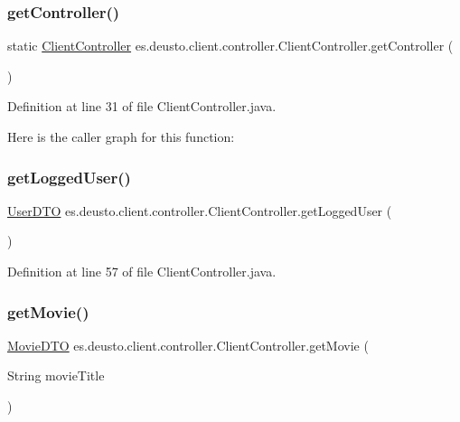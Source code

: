 \subsubsection{\texorpdfstring{getController()}{getController()}}
{\footnotesize\ttfamily static \mbox{\hyperlink{classes_1_1deusto_1_1client_1_1controller_1_1_client_controller}{Client\+Controller}} es.\+deusto.\+client.\+controller.\+Client\+Controller.\+get\+Controller (\begin{DoxyParamCaption}{ }\end{DoxyParamCaption})\hspace{0.3cm}{\ttfamily [static]}}



Definition at line 31 of file Client\+Controller.\+java.

Here is the caller graph for this function\+:
\mbox{\label{classes_1_1deusto_1_1client_1_1controller_1_1_client_controller_ac9d06db0017e2f06d06e8669398118f4}} 
\subsubsection{\texorpdfstring{getLoggedUser()}{getLoggedUser()}}
{\footnotesize\ttfamily \mbox{\hyperlink{classes_1_1deusto_1_1server_1_1data_1_1_user_d_t_o}{User\+D\+TO}} es.\+deusto.\+client.\+controller.\+Client\+Controller.\+get\+Logged\+User (\begin{DoxyParamCaption}{ }\end{DoxyParamCaption})}



Definition at line 57 of file Client\+Controller.\+java.

\mbox{\label{classes_1_1deusto_1_1client_1_1controller_1_1_client_controller_ae371135958d6f88011239d360d936ada}} 
\subsubsection{\texorpdfstring{getMovie()}{getMovie()}}
{\footnotesize\ttfamily \mbox{\hyperlink{classes_1_1deusto_1_1server_1_1data_1_1_movie_d_t_o}{Movie\+D\+TO}} es.\+deusto.\+client.\+controller.\+Client\+Controller.\+get\+Movie (\begin{DoxyParamCaption}\item[{String}]{movie\+Title }\end{DoxyParamCaption})}




